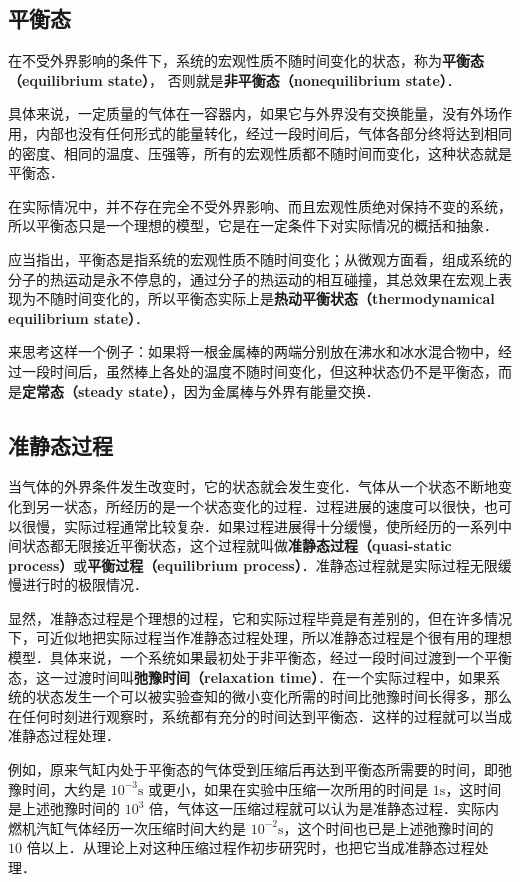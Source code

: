 
\subsection{平衡态}

在不受外界影响的条件下，系统的宏观性质不随时间变化的状态，称为\textbf{平衡态（equilibrium state）}， 否则就是\textbf{非平衡态（nonequilibrium state）}．

具体来说，一定质量的气体在一容器内，如果它与外界没有交换能量，没有外场作用，内部也没有任何形式的能量转化，经过一段时间后，气体各部分终将达到相同的密度、相同的温度、压强等，所有的宏观性质都不随时间而变化，这种状态就是平衡态．

在实际情况中，并不存在完全不受外界影响、而且宏观性质绝对保持不变的系统，所以平衡态只是一个理想的模型，它是在一定条件下对实际情况的概括和抽象．

应当指出，平衡态是指系统的宏观性质不随时间变化；从微观方面看，组成系统的分子的热运动是永不停息的，通过分子的热运动的相互碰撞，其总效果在宏观上表现为不随时间变化的，所以平衡态实际上是\textbf{热动平衡状态（thermodynamical equilibrium state）}．

来思考这样一个例子：如果将一根金属棒的两端分别放在沸水和冰水混合物中，经过一段时间后，虽然棒上各处的温度不随时间变化，但这种状态仍不是平衡态，而是\textbf{定常态（steady state）}，因为金属棒与外界有能量交换．

\subsection{准静态过程}

当气体的外界条件发生改变时，它的状态就会发生变化．气体从一个状态不断地变化到另一状态，所经历的是一个状态变化的过程．过程进展的速度可以很快，也可以很慢，实际过程通常比较复杂．如果过程进展得十分缓慢，使所经历的一系列中间状态都无限接近平衡状态，这个过程就叫做\textbf{准静态过程（quasi-static process）}或\textbf{平衡过程（equilibrium process）}．准静态过程就是实际过程无限缓慢进行时的极限情况．

显然，准静态过程是个理想的过程，它和实际过程毕竟是有差别的，但在许多情况下，可近似地把实际过程当作准静态过程处理，所以准静态过程是个很有用的理想模型．具体来说，一个系统如果最初处于非平衡态，经过一段时间过渡到一个平衡态，这一过渡时间叫\textbf{弛豫时间（relaxation time）}．在一个实际过程中，如果系统的状态发生一个可以被实验查知的微小变化所需的时间比弛豫时间长得多，那么在任何时刻进行观察时，系统都有充分的时间达到平衡态．这样的过程就可以当成准静态过程处理．

例如，原来气缸内处于平衡态的气体受到压缩后再达到平衡态所需要的时间，即弛豫时间，大约是 $10^{-3}\mathrm s$ 或更小，如果在实验中压缩一次所用的时间是 $1\mathrm s$，这时间是上述弛豫时间的 $10^3$ 倍，气体这一压缩过程就可以认为是准静态过程．实际内燃机汽缸气体经历一次压缩时间大约是 $10^{-2}\mathrm s$，这个时间也已是上述弛豫时间的 $10$ 倍以上．从理论上对这种压缩过程作初步研究时，也把它当成准静态过程处理．

